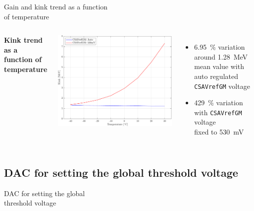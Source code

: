 \documentclass[aspectratio=169,xcolor=dvipsnames]{beamer}
\newcommand{\xmark}{\ding{55}}
\newcommand{\greencheck}{{\color{ForestGreen}\checkmark}}
\newcommand{\redcross}{{\color{Red}\xmark}}
\begin{document}
\begin{frame}{Gain and kink trend as a function\\ \vskip-0.15cm of temperature}
\begin{columns}
            \textbf{Kink trend as a function of temperature}

            \begin{columns}
                \addtolength{\leftmargini}{\labelsep}
                
                    \vskip0.1cm
                    \centering
                    \includegraphics[width=1.15\textwidth]{images/temperature_effects/plot_pedestal_gain_auto_530mV.pdf}

                    \raggedleft
                    \begin{itemize}
                        \item \SI{6.95}{\percent} variation around \SI{1.28}{\mega\electronvolt} mean value with auto regulated \texttt{CSAVrefGM} voltage \greencheck
                        \item \SI{429}{\percent} variation with \texttt{CSAVrefGM} voltage\\ fixed to \SI{530}{\milli\volt} \redcross
                    \end{itemize}
            \end{columns}
    
    \end{columns}
\end{frame}

\subsection{DAC for setting the global threshold voltage\vspace{0.16cm}}
\begin{frame}{DAC for setting the global\\ \vskip-0.15cm threshold voltage}
\fontsize{8.5pt}{1}\selectfont

\end{frame}
\end{document}
